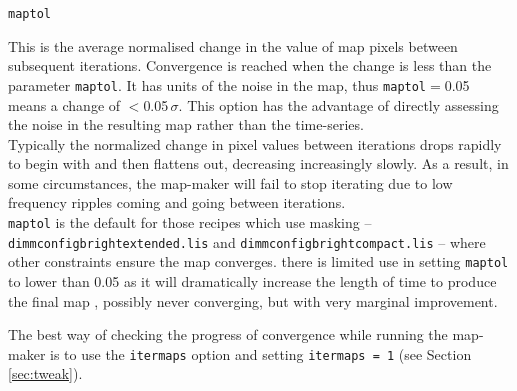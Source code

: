 \documentclass[twoside,11pt]{article}
\renewcommand{\_}{\texttt{\symbol{95}}}
\newcommand{\param}[1]{\texttt{#1}}
\begin{document}
\begin{minipage}[t]{0.1\linewidth}
\texttt{maptol}
\end{minipage}
\begin{minipage}[t]{0.9\linewidth}
 This is the average normalised change in the value of map pixels between subsequent iterations. Convergence is reached when the change is less than the parameter \texttt{maptol}. It has units of the noise in the map, thus \texttt{maptol}$=$0.05 means a change of $<$0.05\,$\sigma$. This option has the advantage of directly assessing the noise in the resulting map rather than the time-series. 
\vspace{3mm}\\
Typically the normalized change in pixel values between iterations drops rapidly to begin with and then flattens out, decreasing increasingly slowly. As a result, in some circumstances, the map-maker will fail to stop iterating due to low frequency ripples coming and going between iterations. 
\vspace{3mm}\\
\texttt{maptol} is the default for those recipes which use masking -- \texttt{dimmconfig\_bright\_extended.lis} and \texttt{dimmconfig\_bright\_compact.lis} -- where other constraints ensure the map converges. there is limited use in setting \texttt{maptol} to lower than 0.05  as it will dramatically increase the length of time to produce the final map , possibly never converging, but with very marginal improvement.
\vspace{3mm}\\
\end{minipage}
The best way of checking the progress of convergence while running the map-maker is to use the \param{itermaps} option and setting \param{itermaps = 1} (see Section \ref{sec:tweak}).
\end{document}
